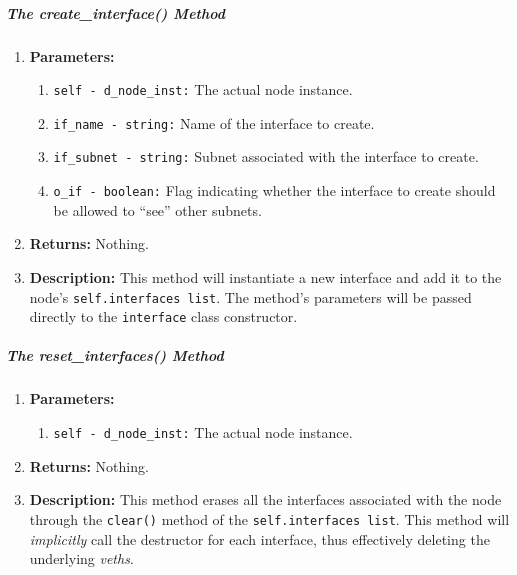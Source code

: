         \subparagraph{The create\_interface() Method}
            \begin{enumerate}
                \item \textbf{Parameters:}
                \begin{enumerate}
                    \item \texttt{self - d\_node\_inst:} The actual node instance.
                    \item \texttt{if\_name - string:} Name of the interface to create.
                    \item \texttt{if\_subnet - string:} Subnet associated with the interface to create.
                    \item \texttt{o\_if - boolean:} Flag indicating whether the interface to create should be allowed to ``see'' other subnets.
                \end{enumerate}
                \item \textbf{Returns:} Nothing.
                \item \textbf{Description:} This method will instantiate a new interface and add it to the node's \texttt{self.interfaces list}. The method's parameters will be passed directly to the \texttt{interface} class constructor.
            \end{enumerate}

        \subparagraph{The reset\_interfaces() Method}
            \begin{enumerate}
                \item \textbf{Parameters:}
                \begin{enumerate}
                    \item \texttt{self - d\_node\_inst:} The actual node instance.
                \end{enumerate}
                \item \textbf{Returns:} Nothing.
                \item \textbf{Description:} This method erases all the interfaces associated with the node through the \texttt{clear()} \cite{bib:python-datastructures} method of the \texttt{self.interfaces list}. This method will \textit{implicitly} call the destructor for each interface, thus effectively deleting the underlying \textit{veths}.
            \end{enumerate}

